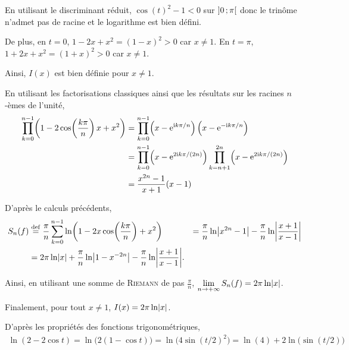 \begin{solution}
\begin{reponses}
\item En utilisant le discriminant réduit, $\cos(t)^2 - 1 < 0$ sur $\left]0\,;\pi\right[$ donc le trinôme n'admet pas de racine et le logarithme est bien défini.

De plus, en $t = 0$, $1 - 2 x + x^2 = (1 - x)^2 > 0$ car $x \neq 1$.
En $t = \pi$, $1 + 2 x + x^2 = (1 + x)^2 > 0$ car $x \neq 1$.

Ainsi, $I(x)$ est bien définie pour $x \neq 1$.

\item En utilisant les factorisations classiques ainsi que les résultats sur les racines $n$-èmes de l'unité,
\begin{align*}
\prod_{k=0}^{n-1} \mathopen{}\left(1 - 2 \cos\mathopen{}\left(\frac{k\pi}{n}\right) x + x^2\right)
&= \prod_{k=0}^{n-1} \mathopen{}\left(x - \mathrm{e}^{\mathrm{i} k\pi/n}\right) \mathopen{}\left(x - \mathrm{e}^{-\mathrm{i} k\pi/n}\right) \\
&= \prod_{k=0}^{n-1} \mathopen{}\left(x - \mathrm{e}^{2\mathrm{i} k\pi/(2n)}\right) \prod_{k=n+1}^{2n} \mathopen{}\left(x - \mathrm{e}^{2\mathrm{i} k\pi/(2n)}\right) \\
&= \frac{x^{2n} - 1}{x + 1} (x - 1)
\end{align*}

\item D'après le calculs précédents,
\begin{align*}
S_n(f)
&\overset{\mathrm{\tiny def}}{=} \frac{\pi}{n}\sum\limits_{k=0}^{n-1} \ln\mathopen{}\left(1 - 2 x \cos\mathopen{}\left(\frac{k\pi}{n}\right) + x^2\right)
&= \frac{\pi}{n} \ln\mathopen{}\abs{x^{2n}-1} - \frac{\pi}{n} \ln \mathopen{}\abs{\frac{x+1}{x-1}} \\
&= 2 \pi \ln\mathopen{}\abs{x} + \frac{\pi}{n} \ln \mathopen{}\abs{1 - x^{-2n}} - \frac{\pi}{n} \ln \mathopen{}\abs{\frac{x+1}{x-1}}.
\end{align*}

Ainsi, en utilisant une somme de \textsc{Riemann} de pas $\frac{\pi}{n}$, $\lim\limits_{n\to +\infty} S_n(f) = 2 \pi \ln\mathopen{}\abs{x}$.

Finalement, pour tout $x \neq 1$, $I(x) = 2 \pi \ln\mathopen{}\abs{x}$.
\item {}D'après les propriétés des fonctions trigonométriques,
\begin{align*}
\ln(2 - 2 \cos t)
= \ln\mathopen{}\big(2(1 - \cos t)\big)
= \ln\mathopen{}\big(4 \sin(t/2)^2\big)
= \ln(4) + 2 \ln\mathopen{}\big(\sin(t/2)\big)
\end{align*}


\end{reponses}
\end{solution}
